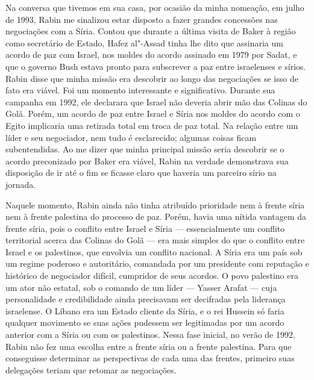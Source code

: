 Na conversa que tivemos em sua casa, por ocasião da minha nomeação, em
julho de 1993, Rabin me sinalizou estar disposto a fazer
grandes concessões nas negociações com a Síria. Contou que durante a
última visita de Baker à região como secretário de Estado, Hafez al"-Assad
tinha lhe dito que assinaria um acordo de paz com Israel, nos
moldes do acordo assinado em 1979 por Sadat, e que o governo Bush estava
pronto para subscrever a paz entre israelenses e sírios. Rabin disse que
minha missão era descobrir ao longo das negociações se isso de fato era
viável. Foi um momento interessante e significativo. Durante sua
campanha em 1992, ele declarara que Israel não deveria abrir mão
das Colinas do Golã. Porém, um acordo de paz entre Israel e Síria nos
moldes do acordo com o Egito implicaria uma retirada total em troca de
paz total. Na relação entre um líder e seu negociador, nem tudo é
esclarecido; algumas coisas ficam subentendidas. Ao me dizer que minha
principal missão seria descobrir se o acordo preconizado por Baker era
viável, Rabin na verdade demonstrava sua disposição de ir até o fim se
ficasse claro que haveria um parceiro sírio na jornada.

Naquele momento, Rabin ainda não tinha atribuído prioridade nem à frente
síria nem à frente palestina do processo de paz. Porém, havia uma nítida
vantagem da frente síria, pois o conflito entre Israel e Síria ---
essencialmente um conflito territorial acerca das Colinas do Golã --- era
mais simples do que o conflito entre Israel e os palestinos, que
envolvia um conflito nacional. A Síria era um país sob um regime
poderoso e autoritário, comandada por um presidente com reputação e
histórico de negociador difícil, cumpridor de seus acordos. O povo
palestino era um ator não estatal, sob o comando de um líder --- Yasser
Arafat --- cuja personalidade e credibilidade ainda precisavam ser
decifradas pela liderança israelense. O Líbano era um Estado cliente da
Síria, e o rei Hussein só faria qualquer movimento se suas ações
pudessem ser legitimadas por um acordo anterior com a Síria ou com os
palestinos. Nessa fase inicial, no verão de 1992, Rabin não fez uma
escolha entre a frente síria ou a frente palestina. Para que conseguisse
determinar as perspectivas de cada uma das frentes, primeiro suas
delegações teriam que retomar as negociações.


